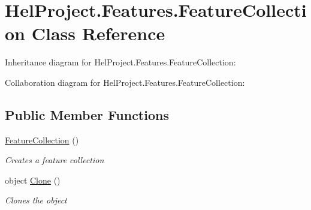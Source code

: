 \hypertarget{class_hel_project_1_1_features_1_1_feature_collection}{}\section{Hel\+Project.\+Features.\+Feature\+Collection Class Reference}
\label{class_hel_project_1_1_features_1_1_feature_collection}


Inheritance diagram for Hel\+Project.\+Features.\+Feature\+Collection\+:


Collaboration diagram for Hel\+Project.\+Features.\+Feature\+Collection\+:
\subsection*{Public Member Functions}
\begin{DoxyCompactItemize}
\item 
\hyperlink{class_hel_project_1_1_features_1_1_feature_collection_a8494a00531f9807cb6e5c57137a12ee8}{Feature\+Collection} ()
\begin{DoxyCompactList}\small\item\em Creates a feature collection \end{DoxyCompactList}\item 
object \hyperlink{class_hel_project_1_1_features_1_1_feature_collection_a920d45565d353cc73c05055018d498eb}{Clone} ()
\begin{DoxyCompactList}\small\item\em Clones the object \end{DoxyCompactList}\end{DoxyCompactItemize}
